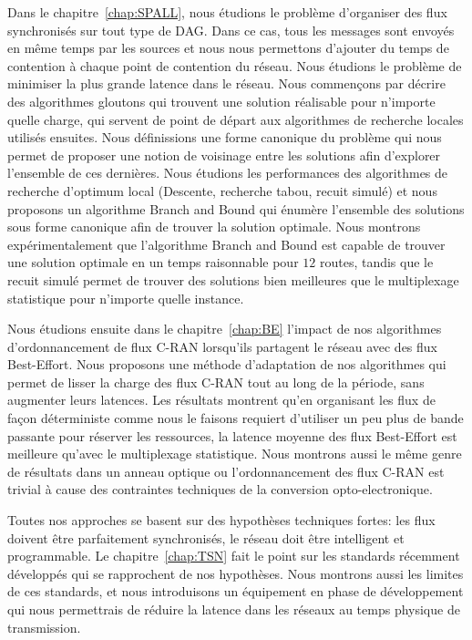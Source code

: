 Dans le chapitre~\ref{chap:SPALL}, nous étudions le problème d'organiser des flux synchronisés sur tout type de DAG. Dans ce cas, tous les messages sont envoyés en même temps par les sources et nous nous permettons d'ajouter du temps de contention à chaque point de contention du réseau. Nous étudions le problème de minimiser la plus grande latence dans le réseau. Nous commençons par décrire des algorithmes gloutons qui trouvent une solution réalisable pour n'importe quelle charge, qui servent de point de départ aux algorithmes de recherche locales utilisés ensuites. Nous définissions une forme canonique du problème qui nous permet de proposer une notion de voisinage entre les solutions afin d'explorer l'ensemble de ces dernières. Nous étudions les performances des algorithmes de recherche d'optimum local (Descente, recherche tabou, recuit simulé) et nous proposons un algorithme Branch and Bound qui énumère l'ensemble des solutions sous forme canonique afin de trouver la solution optimale. Nous montrons expérimentalement que l'algorithme Branch and Bound est capable de trouver une solution optimale en un temps raisonnable pour $12$ routes, tandis que le recuit simulé permet de trouver des solutions bien meilleures que le multiplexage statistique pour n'importe quelle instance.

Nous étudions ensuite dans le chapitre~\ref{chap:BE} l'impact de nos algorithmes d'ordonnancement de flux C-RAN lorsqu'ils partagent le réseau avec des flux Best-Effort. Nous proposons une méthode d'adaptation de nos algorithmes qui permet de lisser la charge des flux C-RAN tout au long de la période, sans augmenter leurs latences. Les résultats montrent qu'en organisant les flux de façon déterministe comme nous le faisons requiert d'utiliser un peu plus de bande passante pour réserver les ressources, la latence moyenne des flux Best-Effort est meilleure qu'avec le multiplexage statistique. Nous montrons aussi le même genre de résultats dans un anneau optique ou l'ordonnancement des flux C-RAN est trivial à cause des contraintes techniques de la conversion opto-electronique.

Toutes nos approches se basent sur des hypothèses techniques fortes: les flux doivent être parfaitement synchronisés, le réseau doit être intelligent et programmable. Le chapitre~\ref{chap:TSN} fait le point sur les standards récemment développés qui se rapprochent de nos hypothèses. Nous montrons aussi les limites de ces standards, et nous introduisons un équipement en phase de développement qui nous permettrais de réduire la latence dans les réseaux au temps physique de transmission.





